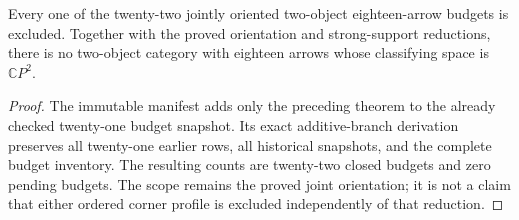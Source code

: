 \begin{corollary}
\label{CP2:A-all-two-object-eighteen-budgets}
Every one of the twenty-two jointly oriented two-object
eighteen-arrow budgets is excluded.  Together with the proved
orientation and strong-support reductions, there is no two-object
category with eighteen arrows whose classifying space is
$\mathbb CP^2$.
\end{corollary}
\begin{proof}
The immutable manifest
adds only the preceding theorem to the already checked twenty-one
budget snapshot.  Its exact additive-branch derivation preserves
all twenty-one earlier rows, all historical snapshots, and the
complete budget inventory.  The resulting counts are twenty-two
closed budgets and zero pending budgets.  The scope remains the
proved joint orientation; it is not a claim that either ordered
corner profile is excluded independently of that reduction.
\end{proof}
